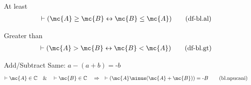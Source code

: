 \begin{metadefinition} {At least}
\begin{align}
\vdash ( \mc{A} \geq \mc{B} \leftrightarrow \mc{B} \le \mc{A} )\label{eq:df-bl.al}\tag{df-bl.al}
\end{align}
\end{metadefinition}

\begin{metadefinition} {Greater than}
\begin{align}
\vdash ( \mc{A} > \mc{B} \leftrightarrow \mc{B} < \mc{A} )\label{eq:df-bl.gt}\tag{df-bl.gt}
\end{align}
\end{metadefinition}

\begin{lemma} {Add/Subtract Same: $a \minus ( a + b ) =
\textrm{-} b$}
\begin{align}
\vdash \mc{A} \in \mathbb{C}\quad\&\quad \vdash \mc{B} \in
    \mathbb{C}\quad\Rightarrow\quad \vdash ( \mc{A} \minus ( \mc{A} + \mc{B} ) ) = \textrm{-}
    B\label{eq:bl.npucani}\tag{bl.npucani}
\end{align}
\end{lemma}

